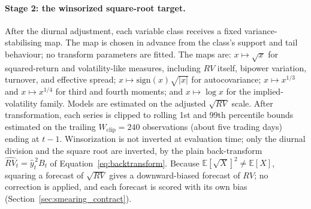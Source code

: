 \paragraph{Stage 2: the winsorized square-root target.}
After the diurnal adjustment, each variable class receives a fixed
variance-stabilising map. The map is chosen in advance from the class's
support and tail behaviour; no transform parameters are fitted. The maps
are: $x \mapsto \sqrt{x}$ for squared-return and volatility-like measures,
including $RV$ itself, bipower variation, turnover, and effective spread;
$x \mapsto \mathrm{sign}(x)\sqrt{|x|}$ for autocovariance;
$x \mapsto x^{1/3}$ and $x \mapsto x^{1/4}$ for third and fourth moments;
and $x \mapsto \log x$ for the implied-volatility family. Models are
estimated on the adjusted $\sqrt{RV}$ scale. After transformation, each
series is clipped to rolling 1st and 99th percentile bounds estimated on
the trailing $W_{\mathrm{clip}} = 240$ observations (about five trading
days) ending at $t-1$. Winsorization is not inverted at evaluation time;
only the diurnal division and the square root are inverted, by the plain
back-transform $\widehat{RV}_t = \hat y_t^{\,2} B_t$ of
Equation~\eqref{eq:backtransform}. Because
$\mathbb{E}[\sqrt{X}]^2 \neq \mathbb{E}[X]$, squaring a forecast of
$\sqrt{RV}$ gives a downward-biased forecast of $RV$; no correction is
applied, and each forecast is scored with its own bias
(Section~\ref{sec:smearing_contract}).


